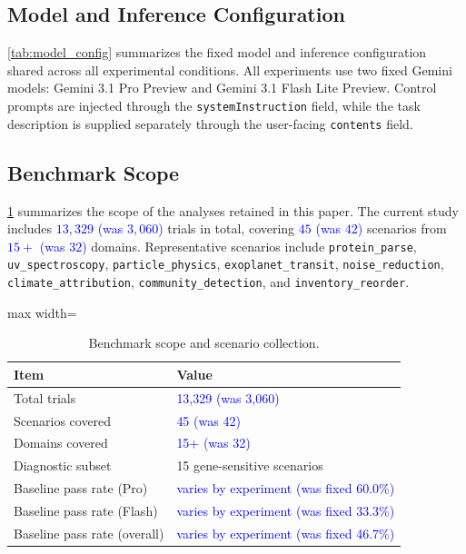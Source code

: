 \documentclass{article}
\newcommand{\blue}[1]{\textcolor{blue}{#1}}
\begin{document}
\subsection{Model and Inference Configuration}
\label{app:model_config}

\cref{tab:model_config} summarizes the fixed model and inference configuration shared across all experimental conditions.
All experiments use two fixed Gemini models: Gemini 3.1 Pro Preview and Gemini 3.1 Flash Lite Preview. 
Control prompts are injected through the \texttt{systemInstruction} field, while the task description is supplied separately through the user-facing \texttt{contents} field. 



\subsection{Benchmark Scope}
\label{app:benchmark_scope}

\cref{tab:scenario_scope} summarizes the scope of the analyses retained in this paper.
The current study includes \blue{$13,329$ (was $3,060$)} trials in total, covering \blue{$45$ (was $42$)} scenarios from \blue{$15+$ (was $32$)} domains.
Representative scenarios include \texttt{protein\_parse}, \texttt{uv\_spectroscopy}, \texttt{particle\_physics}, \texttt{exoplanet\_transit}, \texttt{noise\_reduction}, \texttt{climate\_attribution}, \texttt{community\_detection}, and \texttt{inventory\_reorder}.

\begin{table}[t]
\centering
\caption{Benchmark scope and scenario collection.}
\label{tab:scenario_scope}
\begin{adjustbox}{max width=\columnwidth}
\begin{tabular}{ll}
\toprule
\textbf{Item} & \textbf{Value} \\
\midrule
Total trials & \blue{13,329 (was 3,060)} \\
Scenarios covered & \blue{45 (was 42)} \\
Domains covered & \blue{15+ (was 32)} \\
Diagnostic subset & 15 gene-sensitive scenarios \\
Baseline pass rate (Pro) & \blue{varies by experiment (was fixed 60.0\%)} \\
Baseline pass rate (Flash) & \blue{varies by experiment (was fixed 33.3\%)} \\
Baseline pass rate (overall) & \blue{varies by experiment (was fixed 46.7\%)} \\
\bottomrule
\end{tabular}
\end{adjustbox}
\end{table}
\end{document}
